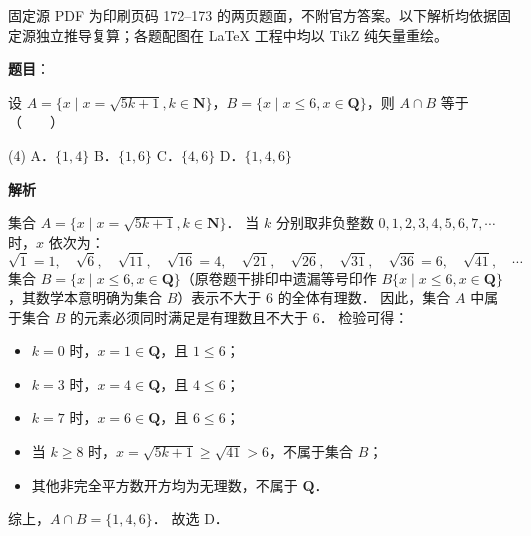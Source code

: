 

\begin{gktip}
固定源 PDF 为印刷页码 172–173 的两页题面，不附官方答案。以下解析均依据固定源独立推导复算；各题配图在 LaTeX 工程中均以 TikZ 纯矢量重绘。
\end{gktip}

\begin{answer}

\textbf{题目}：

设 $A = \{x \mid x = \sqrt{5k + 1}, k \in \mathbf{N}\}$，$B = \{x \mid x \leqslant 6, x \in \mathbf{Q}\}$，则 $A \cap B$ 等于\mbox{（　　）}

\begin{gkopts}(4)
\task A．$\{1, 4\}$
\task B．$\{1, 6\}$
\task C．$\{4, 6\}$
\task D．$\{1, 4, 6\}$
\end{gkopts}

\textbf{解析}

集合 $A = \{x \mid x = \sqrt{5k + 1}, k \in \mathbf{N}\}$．
当 $k$ 分别取非负整数 $0, 1, 2, 3, 4, 5, 6, 7, \cdots$ 时，$x$ 依次为：
\nopagebreak[4]
\[
\sqrt{1} = 1, \quad \sqrt{6}, \quad \sqrt{11}, \quad \sqrt{16} = 4, \quad \sqrt{21}, \quad \sqrt{26}, \quad \sqrt{31}, \quad \sqrt{36} = 6, \quad \sqrt{41}, \quad \cdots
\]
集合 $B = \{x \mid x \leqslant 6, x \in \mathbf{Q}\}$（原卷题干排印中遗漏等号印作 $B\{x \mid x \leqslant 6, x \in \mathbf{Q}\}$，其数学本意明确为集合 $B$）表示不大于 $6$ 的全体有理数．
因此，集合 $A$ 中属于集合 $B$ 的元素必须同时满足是有理数且不大于 $6$．
检验可得：
\begin{itemize}
\item $k = 0$ 时，$x = 1 \in \mathbf{Q}$，且 $1 \leqslant 6$；
\item $k = 3$ 时，$x = 4 \in \mathbf{Q}$，且 $4 \leqslant 6$；
\item $k = 7$ 时，$x = 6 \in \mathbf{Q}$，且 $6 \leqslant 6$；
\item 当 $k \geqslant 8$ 时，$x = \sqrt{5k + 1} \geqslant \sqrt{41} > 6$，不属于集合 $B$；
\item 其他非完全平方数开方均为无理数，不属于 $\mathbf{Q}$．
\end{itemize}

综上，$A \cap B = \{1, 4, 6\}$．
故选 D．


\end{answer}
